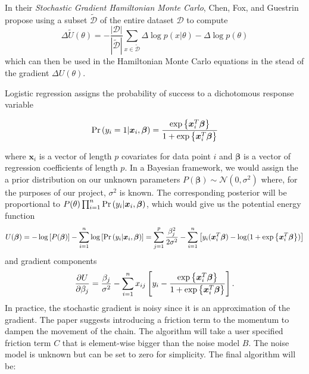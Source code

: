In their \textit{Stochastic Gradient Hamiltonian Monte Carlo}, Chen, Fox, and Guestrin propose using a subset $\tilde{\mathcal{D}}$ of the entire dataset $\mathcal{D}$ to compute
\begin{equation*}
	\Delta\tilde{U}(\theta)=-\frac{|\mathcal{D}|}{|\tilde{\mathcal{D}}|}\sum_{x\in\tilde{\mathcal{D}}}\Delta\log p(x|\theta) - \Delta\log p(\theta)
\end{equation*}
which can then be used in the Hamiltonian Monte Carlo equations in the stead of the gradient $\Delta U(\theta)$.

Logistic regression assigns the probability of success to a dichotomous response variable

\begin{equation*}
	\mathrm{Pr}\left(y_i=1|\bm{x}_{i},\bm{\beta}\right)=\frac{\exp\left\lbrace\bm{x}_i^T\bm{\beta} \right\rbrace}{1+\exp\left\lbrace\bm{x}_i^T\bm{\beta} \right\rbrace}
\end{equation*}

where $\bm{x}_i$ is a vector of length $p$ covariates for data point $i$ and $\bm{\beta}$ is a vector of regression coefficients of length $p$. In a Bayesian framework, we would assign the a prior distribution on our unknown parameters $P(\bm{\beta})\sim\mathcal{N}(0, \sigma^2)$ where, for the purposes of our project, $\sigma^2$ is known. The corresponding posterior will be proportional to $P(\theta)\prod_{i=1}^n\mathrm{Pr}\left(y_i|\bm{x}_i,\bm{\beta}\right)$, which would give us the potential energy function
\begin{equation*}
U(\bm{\beta})=-\log\left[P(\bm{\beta})\right] - \sum_{i=1}^n\log\left[\mathrm{Pr}\left(y_i|\bm{x}_i,\bm{\beta}\right)\right]=\sum_{j=1}^p\frac{\beta_j^2}{2\sigma^2}-\sum_{i=1}^n\left[y_i(\bm{x}_i^T\bm{\beta})-\log(1+\exp\left\lbrace\bm{x}_i^T\bm{\beta} \right\rbrace)\right]
\end{equation*}
and gradient components
\begin{equation*}
\frac{\partial U}{\partial \beta_j}=\frac{\beta_j}{\sigma^2}-\sum_{i=1}^{n}x_{ij}\left[y_i-\frac{\exp\left\lbrace\bm{x}_i^T\bm{\beta} \right\rbrace}{1+\exp\left\lbrace\bm{x}_i^T\bm{\beta} \right\rbrace}\right]. 
\end{equation*}
In practice, the stochastic gradient is noisy since it is an approximation of the gradient. The paper suggests introducing a friction term to the momentum to dampen the movement of the chain. The algorithm will take a user specified friction term $C$ that is element-wise bigger than the noise model $B$. The noise model is unknown but can be set to zero for simplicity. The final algorithm will be:

